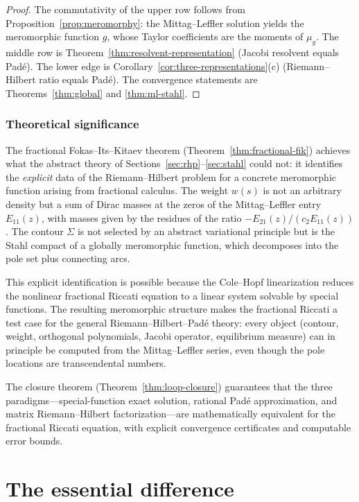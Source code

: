 \documentclass[11pt]{article}
\theoremstyle{definition}
\theoremstyle{remark}
\begin{document}
\begin{proof}
The commutativity of the upper row follows from Proposition~\ref{prop:meromorphy}: the Mittag--Leffler solution yields the meromorphic function $g$, whose Taylor coefficients are the moments of $\mu_{g}$. The middle row is Theorem~\ref{thm:resolvent-representation} (Jacobi resolvent equals Pad\'e). The lower edge is Corollary~\ref{cor:three-representations}(c) (Riemann--Hilbert ratio equals Pad\'e). The convergence statements are Theorems~\ref{thm:global} and \ref{thm:ml-stahl}.
\end{proof}

\subsubsection{Theoretical significance}
\label{sec:fik-significance}

The fractional Fokas--Its--Kitaev theorem (Theorem~\ref{thm:fractional-fik}) achieves what the abstract theory of Sections~\ref{sec:rhp}--\ref{sec:stahl} could not: it identifies the \emph{explicit} data of the Riemann--Hilbert problem for a concrete meromorphic function arising from fractional calculus. The weight $w(s)$ is not an arbitrary density but a sum of Dirac masses at the zeros of the Mittag--Leffler entry $E_{11}(z)$, with masses given by the residues of the ratio $-E_{21}(z)/(c_{2}E_{11}(z))$. The contour $\Sigma$ is not selected by an abstract variational principle but is the Stahl compact of a globally meromorphic function, which decomposes into the pole set plus connecting arcs.

This explicit identification is possible because the Cole--Hopf linearization reduces the nonlinear fractional Riccati equation to a linear system solvable by special functions. The resulting meromorphic structure makes the fractional Riccati a test case for the general Riemann--Hilbert--Pad\'e theory: every object (contour, weight, orthogonal polynomials, Jacobi operator, equilibrium measure) can in principle be computed from the Mittag--Leffler series, even though the pole locations are transcendental numbers.

The closure theorem (Theorem~\ref{thm:loop-closure}) guarantees that the three paradigms---special-function exact solution, rational Pad\'e approximation, and matrix Riemann--Hilbert factorization---are mathematically equivalent for the fractional Riccati equation, with explicit convergence certificates and computable error bounds.

\section{The essential difference}
\label{sec:conclusion}
\end{document}
